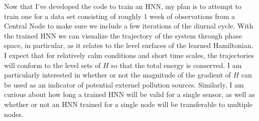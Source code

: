 Now that I've developed the code to train an HNN, my plan is to attempt to train one for a data set consisting of roughly 1 week of observations from a Central Node to make sure we include a few iterations of the diurnal cycle. With the trained HNN we can visualize the trajectory of the system through phase space, in particular, as it relates to the level surfaces of the learned Hamiltonian. I expect that for relatively calm conditions and short time scales, the trajectories will conform to the level sets of $H$ so that the total energy is conserved. I am particularly interested in whether or not the magnitude of the gradient of $H$ can be used as an indicator of potential externel pollution sources. Similarly, I am curious about how long a trained HNN will be valid for a single sensor, as well as whether or not an HNN trained for a single node will be transferable to multiple nodes. 



